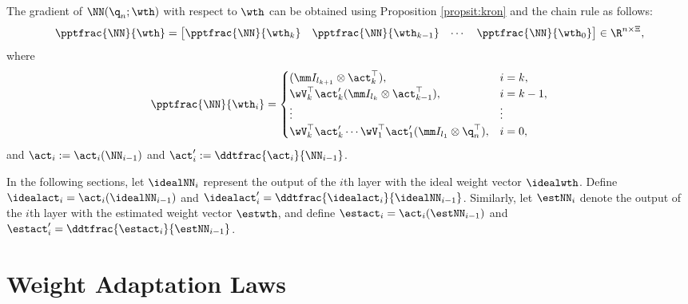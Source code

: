 \documentclass[letterpaper, journal]{IEEEtran}
\begin{document}
The gradient of $ \NN({\q}_n;\wth)$ with respect to $\wth$ can be obtained using Proposition \ref{propsit:kron} and the chain rule as follows:
\begin{equation}
    \pptfrac{\NN}{\wth}=
    \begin{bmatrix}
        \pptfrac{\NN}{\wth_k}&
        \pptfrac{\NN}{\wth_{k-1}}&
    \cdots &
        \pptfrac{\NN}{\wth_0}
    \end{bmatrix}
    \in\R^{n \times \Xi}
    ,
    \label{eq:gradient:phi}
\end{equation}
where
\begin{equation}
    \pptfrac{\NN}{\wth_i} = 
    \begin{cases}
        (
            \mm I_{l_{k+1}}
            \otimes 
            \act_{k}^\top  
        )
        , 
        &
        i=k
        ,
        \\
        \wV_k^\top\act_{k}' 
        (
            \mm I_{l_{k}}
            \otimes  
            \act_{k-1}^\top  
        )
        , 
        & 
        i=k-1
        ,
        \\
        \vdots 
        &
        \vdots 
        \\
        \wV_k^\top\act'_{k} 
        \cdots 
        \wV_1^\top\act_1' 
        (
            \mm I_{l_1}
            \otimes 
            {\q}_n^\top  
        )
        , 
        &
        i = 0
        ,
    \end{cases}
    \label{eq:NN:grad}
\end{equation}
and $\act_i:= \act_i(\NN_{i-1})$ and $\act_i':= \ddtfrac{\act_i}{\NN_{i-1}}$.

In the following sections, let $\idealNN_i$ represent the output of the $i$th layer with the ideal weight vector $\idealwth$. 
Define $\idealact_i=\act_i(\idealNN_{i-1})$ and ${\idealact}'_i= \ddtfrac{\idealact_i}{\idealNN_{i-1}}$. 
Similarly, let $\estNN_i$ denote the output of the $i$th layer with the estimated weight vector $\estwth$, and define $\estact_i=\act_i(\estNN_{i-1})$ and $\estact_i'= \ddtfrac{\estact_i}{\estNN_{i-1}}$.

\section{Weight Adaptation Laws}\label{sec:adap_laws}

\end{document}
